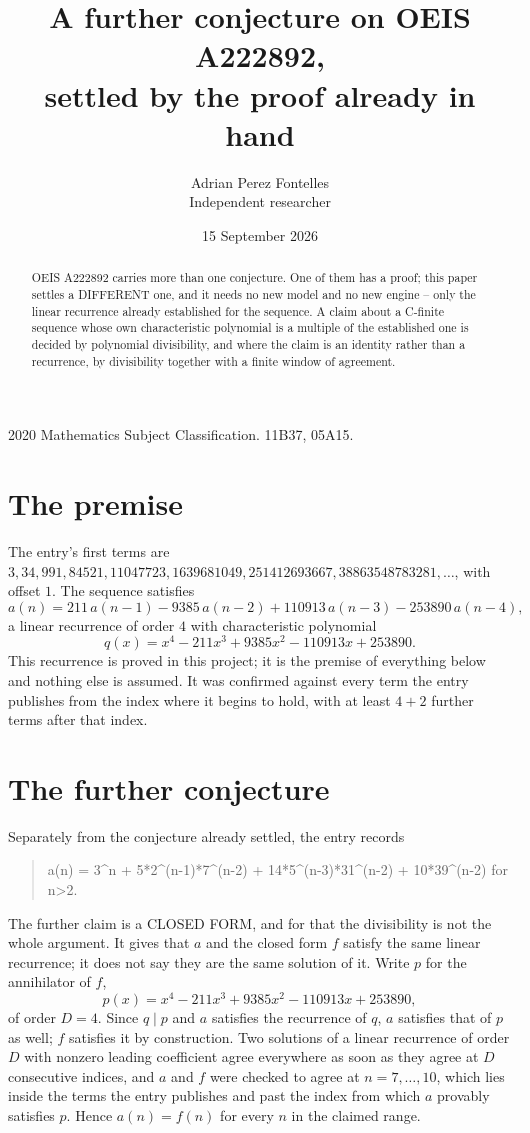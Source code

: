 \documentclass[11pt,a4paper]{article}
\title{A further conjecture on OEIS A222892,\\ \large settled by the proof already in hand}
\author{Adrian Perez Fontelles\\ \small Independent researcher}
\date{15 September 2026}
\theoremstyle{plain}
\theoremstyle{definition}
\begin{document}
\maketitle

\begin{abstract}
OEIS A222892 carries more than one conjecture. One of them has a proof; this paper settles a
DIFFERENT one, and it needs no new model and no new engine -- only the linear recurrence already
established for the sequence. A claim about a C-finite sequence whose own characteristic
polynomial is a multiple of the established one is decided by polynomial divisibility, and where
the claim is an identity rather than a recurrence, by divisibility together with a finite window
of agreement.
\end{abstract}

\noindent\small 2020 Mathematics Subject Classification. 11B37, 05A15.\normalsize

\section{The premise}

The entry's first terms are $3, 34, 991, 84521, 11047723, 1639681049, 251412693667, 38863548783281,\dots$, with offset $1$. The sequence satisfies
\[
  a(n)=211\,a(n-1) - 9385\,a(n-2) + 110913\,a(n-3) - 253890\,a(n-4) ,
\]
a linear recurrence of order $4$ with characteristic polynomial
\[
  q(x)=x^{4} - 211 x^{3} + 9385 x^{2} - 110913 x + 253890 .
\]
This recurrence is proved in this project; it is the premise of everything below and nothing else is assumed.
It was confirmed against every term the entry publishes from the index where it begins to hold,
with at least $4+2$ further terms after that index.

\section{The further conjecture}

Separately from the conjecture already settled, the entry records

\begin{quote}\raggedright a(n) = 3\^{}n + 5*2\^{}(n-1)*7\^{}(n-2) + 14*5\^{}(n-3)*31\^{}(n-2) + 10*39\^{}(n-2) for n>2.\end{quote}

The further claim is a CLOSED FORM, and for that the divisibility is not the whole argument. It
gives that $a$ and the closed form $f$ satisfy the same linear recurrence; it does not say they
are the same solution of it. Write $p$ for the annihilator of $f$,
\[
  p(x)=x^{4} - 211 x^{3} + 9385 x^{2} - 110913 x + 253890 ,
\]
of order $D=4$. Since $q\mid p$ and $a$ satisfies the recurrence of $q$, $a$ satisfies that of
$p$ as well; $f$ satisfies it by construction. Two solutions of a linear recurrence of order $D$
with nonzero leading coefficient agree everywhere as soon as they agree at $D$ consecutive
indices, and $a$ and $f$ were checked to agree at $n=7,\dots,10$,
which lies inside the terms the entry publishes and past the index from which $a$ provably
satisfies $p$. Hence $a(n)=f(n)$ for every $n$ in the claimed range.
\end{document}
